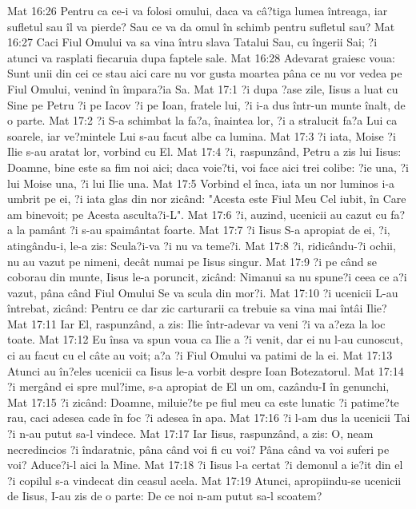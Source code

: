 Mat 16:26  Pentru ca ce-i va folosi omului, daca va câ?tiga lumea întreaga, iar sufletul sau îl va pierde? Sau ce va da omul în schimb pentru sufletul sau?
Mat 16:27  Caci Fiul Omului va sa vina întru slava Tatalui Sau, cu îngerii Sai; ?i atunci va rasplati fiecaruia dupa faptele sale.
Mat 16:28  Adevarat graiesc voua: Sunt unii din cei ce stau aici care nu vor gusta moartea pâna ce nu vor vedea pe Fiul Omului, venind în împara?ia Sa.
Mat 17:1  ?i dupa ?ase zile, Iisus a luat cu Sine pe Petru ?i pe Iacov ?i pe Ioan, fratele lui, ?i i-a dus într-un munte înalt, de o parte.
Mat 17:2  ?i S-a schimbat la fa?a, înaintea lor, ?i a stralucit fa?a Lui ca soarele, iar ve?mintele Lui s-au facut albe ca lumina.
Mat 17:3  ?i iata, Moise ?i Ilie s-au aratat lor, vorbind cu El.
Mat 17:4  ?i, raspunzând, Petru a zis lui Iisus: Doamne, bine este sa fim noi aici; daca voie?ti, voi face aici trei colibe: ?ie una, ?i lui Moise una, ?i lui Ilie una.
Mat 17:5  Vorbind el înca, iata un nor luminos i-a umbrit pe ei, ?i iata glas din nor zicând: "Acesta este Fiul Meu Cel iubit, în Care am binevoit; pe Acesta asculta?i-L".
Mat 17:6  ?i, auzind, ucenicii au cazut cu fa?a la pamânt ?i s-au spaimântat foarte.
Mat 17:7  ?i Iisus S-a apropiat de ei, ?i, atingându-i, le-a zis: Scula?i-va ?i nu va teme?i.
Mat 17:8  ?i, ridicându-?i ochii, nu au vazut pe nimeni, decât numai pe Iisus singur.
Mat 17:9  ?i pe când se coborau din munte, Iisus le-a poruncit, zicând: Nimanui sa nu spune?i ceea ce a?i vazut, pâna când Fiul Omului Se va scula din mor?i.
Mat 17:10  ?i ucenicii L-au întrebat, zicând: Pentru ce dar zic carturarii ca trebuie sa vina mai întâi Ilie?
Mat 17:11  Iar El, raspunzând, a zis: Ilie într-adevar va veni ?i va a?eza la loc toate.
Mat 17:12  Eu însa va spun voua ca Ilie a ?i venit, dar ei nu l-au cunoscut, ci au facut cu el câte au voit; a?a ?i Fiul Omului va patimi de la ei.
Mat 17:13  Atunci au în?eles ucenicii ca Iisus le-a vorbit despre Ioan Botezatorul.
Mat 17:14  ?i mergând ei spre mul?ime, s-a apropiat de El un om, cazându-I în genunchi,
Mat 17:15  ?i zicând: Doamne, miluie?te pe fiul meu ca este lunatic ?i patime?te rau, caci adesea cade în foc ?i adesea în apa.
Mat 17:16  ?i l-am dus la ucenicii Tai ?i n-au putut sa-l vindece.
Mat 17:17  Iar Iisus, raspunzând, a zis: O, neam necredincios ?i îndaratnic, pâna când voi fi cu voi? Pâna când va voi suferi pe voi? Aduce?i-l aici la Mine.
Mat 17:18  ?i Iisus l-a certat ?i demonul a ie?it din el ?i copilul s-a vindecat din ceasul acela.
Mat 17:19  Atunci, apropiindu-se ucenicii de Iisus, I-au zis de o parte: De ce noi n-am putut sa-l scoatem?
